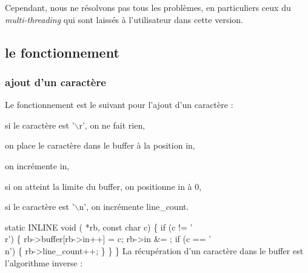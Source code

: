 \documentclass{scrartcl}%
\begin{document}
Cependant, nous ne résolvons pas tous les problèmes, en particuliers ceux du \emph{multi-threading} qui sont laissés à l'utilisateur dans cette version.


\subsection{le fonctionnement}
\subsubsection{ajout d'un caractère}
Le fonctionnement est le suivant pour l'ajout d'un caractère :

\begin{packed_itemize}
  \item si le caractère est '$\backslash$r', on ne fait rien,
  \item on place le caractère dans le buffer à la position {\Tt{}in\nwendquote},
  \item on incrémente {\Tt{}in\nwendquote},
  \item si on atteint la limite du buffer, on positionne {\Tt{}in\nwendquote} à 0,
  \item si le caractère est '$\backslash$n', on incrémente {\Tt{}line{\_}count\nwendquote}.
\end{packed_itemize}

\nwenddocs{}\endmoddef\nwstartdeflinemarkup{}\nwenddeflinemarkup
static INLINE void ( *rb, const char c) \{
    if (c != '\\r') \{
        rb->buffer[rb->in++] = c;
        rb->in &= ;
        if (c == '\\n') \{
            rb->line_count++;
        \}
    \}
\}
\nwendcode{}\nwdocspar
La récupération d'un caractère dans le buffer est l'algorithme inverse :
\end{document}
